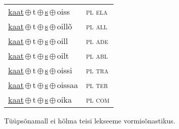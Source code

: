 \begin{minipage}{\textwidth}
\begin{sideways}
\begin{tabular}{l l}
\underline{kaat}\,$\oplus$\,t\,$\oplus$\,\underline{s}\,$\oplus$\,oiss & \textsc{ pl ela } \\
\underline{kaat}\,$\oplus$\,t\,$\oplus$\,\underline{s}\,$\oplus$\,oillõ & \textsc{ pl all } \\
\underline{kaat}\,$\oplus$\,t\,$\oplus$\,\underline{s}\,$\oplus$\,oill & \textsc{ pl ade } \\
\underline{kaat}\,$\oplus$\,t\,$\oplus$\,\underline{s}\,$\oplus$\,oilt & \textsc{ pl abl } \\
\underline{kaat}\,$\oplus$\,t\,$\oplus$\,\underline{s}\,$\oplus$\,oissi & \textsc{ pl tra } \\
\underline{kaat}\,$\oplus$\,t\,$\oplus$\,\underline{s}\,$\oplus$\,oissaa & \textsc{ pl ter } \\
\underline{kaat}\,$\oplus$\,t\,$\oplus$\,\underline{s}\,$\oplus$\,oika & \textsc{ pl com } \\
\end{tabular}
\end{sideways}
\label{tab:tüüpsõnamall-kaatsõd}

\end{minipage}

 
\vspace{1em}
\noindent Tüüpsõnamall  ei hõlma teisi lekseeme vormi\-sõnastikus.
